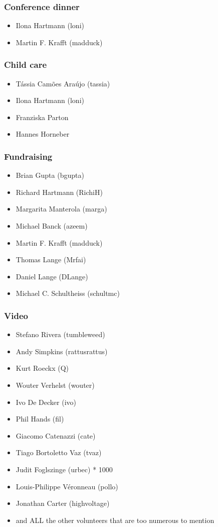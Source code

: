 \documentclass[t]{beamer}
\begin{document}
\begin{frame}
	\frametitle{Conference dinner}
	\begin{itemize}
		\item Ilona Hartmann (loni)
		\item Martin F. Krafft (madduck)
	\end{itemize}
\end{frame}

\begin{frame}
	\frametitle{Child care}
	\begin{itemize}
		\item Tássia Camões Araújo (tassia)
		\item Ilona Hartmann (loni)
		\item Franziska Parton
		\item Hannes Horneber
	\end{itemize}
\end{frame}

\begin{frame}
	\frametitle{Fundraising}
	\begin{itemize}
		\item Brian Gupta (bgupta)
		\item Richard Hartmann (RichiH)
		\item Margarita Manterola (marga)
		\item Michael Banck (azeem)
		\item Martin F. Krafft (madduck)
		\item Thomas Lange (Mrfai)
		\item Daniel Lange (DLange)
		\item Michael C. Schultheiss (schultmc)
	\end{itemize}
\end{frame}

\begin{frame}
	\frametitle{Video}
	\begin{itemize}
		\item Stefano Rivera (tumbleweed)
		\item Andy Simpkins (rattusrattus)
		\item Kurt Roeckx (Q)
		\item Wouter Verhelst (wouter)
		\item Ivo De Decker (ivo)
		\item Phil Hands (fil)
		\item Giacomo Catenazzi (cate)
		\item Tiago Bortoletto Vaz (tvaz)
		\item Judit Foglszinge (urbec) * 1000
		\item Louis-Philippe Véronneau (pollo)
		\item Jonathan Carter (highvoltage)
		\item and ALL the other volunteers that are too numerous to mention
	\end{itemize}
\end{frame}
\end{document}
